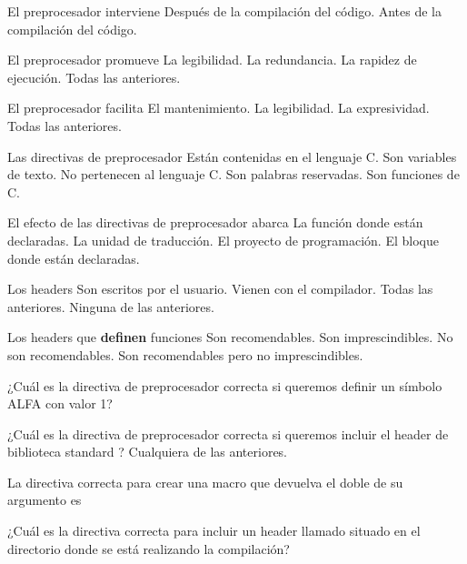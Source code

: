 \begin{preguntas}

\question El preprocesador interviene
\choice Después de la compilación del código.
\correctchoice Antes de la compilación del código.

\question El preprocesador promueve
\correctchoice La legibilidad.
\choice La redundancia.
\choice La rapidez de ejecución.
\choice Todas las anteriores.

\question El preprocesador facilita
\choice El mantenimiento.
\choice La legibilidad.
\choice La expresividad.
\correctchoice Todas las anteriores.

\question Las directivas de preprocesador
\choice Están contenidas en el lenguaje C.
\choice Son variables de texto.
\correctchoice No pertenecen al lenguaje C.
\choice Son palabras reservadas.
\choice Son funciones de C.

\question El efecto de las directivas de preprocesador abarca
\choice La función donde están declaradas.
\correctchoice La unidad de traducción.
\choice El proyecto de programación.
\choice El bloque donde están declaradas.

\question Los headers
\choice Son escritos por el usuario.
\choice Vienen con el compilador.
\correctchoice Todas las anteriores.
\choice Ninguna de las anteriores.

\question Los headers que \textbf{definen} funciones
\choice Son recomendables.
\choice Son imprescindibles.
\correctchoice No son recomendables.
\choice Son recomendables pero no imprescindibles.

\question ¿Cuál es la directiva de preprocesador correcta si queremos definir un símbolo ALFA con valor 1?
\choice {}
\choice {}
\correctchoice {}
\choice {}

\question ¿Cuál es la directiva de preprocesador correcta si queremos incluir el header de biblioteca standard ?
\choice {}
\choice {}
\correctchoice {}
\choice Cualquiera de las anteriores.

\question La directiva correcta para crear una macro que devuelva el doble de su argumento es
\choice {}
\choice {}
\correctchoice {}
\choice {}
\choice {}

\question ¿Cuál es la directiva correcta para incluir un header llamado   situado en el directorio donde se está realizando la compilación?
\choice {}
\choice {}
\correctchoice {}


\end{preguntas}

